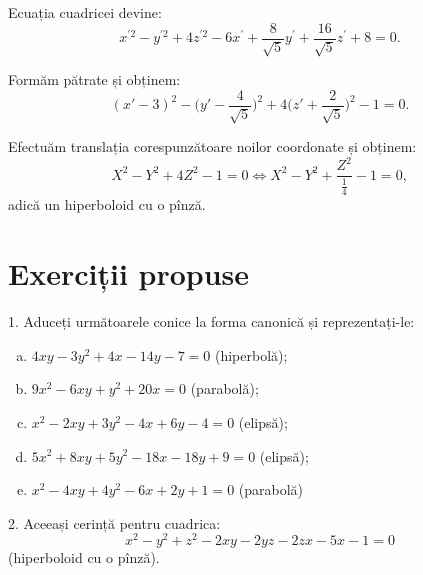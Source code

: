 Ecuația cuadricei devine:
\[
  x^{\prime 2} - y^{\prime 2} + 4 z^{\prime 2} - 6x^\prime + %
  \frac{8}{\sqrt{5}} y^\prime + \frac{16}{\sqrt{5}} z^\prime + 8 = 0.
\]

Formăm pătrate și obținem:
\[
  (x' - 3)^2 - \big( y' - \frac{4}{\sqrt{5}} \big)^2 + %
  4 \big(z' + \frac{2}{\sqrt{5}} \big)^2 - 1 = 0.
\]

Efectuăm translația corespunzătoare noilor coordonate și obținem:
\[
  X^2 - Y^2 + 4Z^2 - 1 = 0 \Leftrightarrow X^2 - Y^2 + \frac{Z^2}{\frac{1}{4}} - 1 = 0,
\]
adică un hiperboloid cu o pînză.


\section{Exerciții propuse}

1. Aduceți următoarele conice la forma canonică și reprezentați-le:
\begin{enumerate}[(a)]
\item $ 4xy - 3y^2 + 4x - 14y - 7 = 0 $ (hiperbolă);
\item $ 9x^2 - 6xy + y^2 + 20x = 0 $ (parabolă);
\item $ x^2 - 2xy + 3y^2 - 4x + 6y - 4 = 0 $ (elipsă);
\item $ 5x^2 + 8xy + 5y^2 - 18x - 18y + 9 = 0 $ (elipsă);
\item $ x^2 - 4xy + 4y^2 - 6x + 2y + 1 = 0 $ (parabolă)
\end{enumerate}

\vspace{1cm}

2. Aceeași cerință pentru cuadrica:
\[
  x^2 - y^2 + z^2 - 2xy - 2yz - 2zx - 5x - 1 = 0
\]
(hiperboloid cu o pînză).


